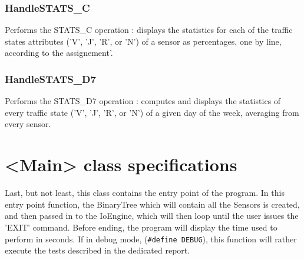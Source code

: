 \documentclass[10pt]{article}
\begin{document}
\subsubsection*{HandleSTATS\_C}
Performs the STATS\_C operation : displays the statistics for each of the traffic states attributes ('V', 'J', 'R', or 'N') of a sensor as percentages, one by line, according to the assignement\footnotemark[2]'\footnotemark[3].

\subsubsection*{HandleSTATS\_D7}
Performs the STATS\_D7 operation : computes and displays the statistics of every traffic state ('V', 'J', 'R', or 'N') of a given day of the week, averaging from every sensor\footnotemark[2].

\section{<Main> class specifications}
Last, but not least, this class contains the entry point of the program. In this entry point function, the BinaryTree which will contain all the Sensors is created, and then passed in to the IoEngine, which will then loop until the user issues the 'EXIT' command. Before ending, the program will display the time used to perform in seconds.
If in debug mode, (\texttt{\#define DEBUG}), this function will rather execute the tests described in the dedicated report.
\end{document}
